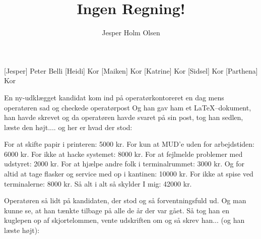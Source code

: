 \documentclass[danish]{article}
\title{Ingen Regning!}
\author{Jesper Holm Olsen}
\begin{document}
\maketitle

\begin{roles}
  [Jesper] Peter Belli
  [Heidi] Kor
  [Maiken] Kor
  [Katrine] Kor
  [Sidsel] Kor
  [Parthena] Kor
\end{roles}

\begin{song}

 En ny-udklægget kandidat kom ind på operatørkontoreret en dag
mens operatøren sad og checkede operatørpost
Og han gav ham et \LaTeX--dokument, han havde skrevet
og da operatøren havde svaret på sin post, 
tog han sedlen, læste den højt....
og her er hvad der stod:

 For at skifte papir i printeren: 5000 kr.
For kun at MUD'e uden for arbejdstiden: 6000 kr.
For ikke at hacke systemet: 8000 kr.
For at fejlmelde problemer med udstyret: 2000 kr.
For at hjælpe andre folk i terminalrummet: 3000 kr.
Og for altid at tage flasker og service med op i kantinen: 10000 kr. 
For ikke at spise ved terminalerne: 8000 kr.
Så alt i alt så skylder I mig: 42000 kr.


 Operatøren så lidt på kandidaten, der stod og så forventningsfuld ud. 
Og man kunne se, at han tænkte tilbage på alle de år der var gået. 
Så tog han en kuglepen op af skjortelommen, vente udskriften om 
og så skrev han... (og han læste højt):


\end{song}
\end{document}
